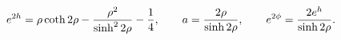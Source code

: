 \begin{equation}
e^{2h}=\rho \coth{2\rho}-{\rho^2 \over \sinh^2{2\rho}}-{1\over4},\qquad
a={2\rho \over \sinh{2\rho}},\qquad
e^{2\phi}={2e^h\over \sinh{2\rho}}.
\end{equation}

